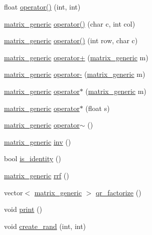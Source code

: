 \begin{DoxyCompactItemize}
\item 
float \hyperlink{classmatrix__generic_a08e93a0993b46d5373d5eb35211d0e8e}{operator()} (int, int)
\item 
\hyperlink{classmatrix__generic}{matrix\-\_\-generic} \hyperlink{classmatrix__generic_a55abbb7eb09ab51a86d3ca9289b974ab}{operator()} (char c, int col)
\item 
\hyperlink{classmatrix__generic}{matrix\-\_\-generic} \hyperlink{classmatrix__generic_a276b6bba1b5e097d83d0ec65adf30b2e}{operator()} (int row, char c)
\item 
\hyperlink{classmatrix__generic}{matrix\-\_\-generic} \hyperlink{classmatrix__generic_a860de6cafb81579ae947efa84e99c355}{operator+} (\hyperlink{classmatrix__generic}{matrix\-\_\-generic} m)
\item 
\hyperlink{classmatrix__generic}{matrix\-\_\-generic} \hyperlink{classmatrix__generic_ae2ae697439be499177bc533c6d14f5e5}{operator-\/} (\hyperlink{classmatrix__generic}{matrix\-\_\-generic} m)
\item 
\hyperlink{classmatrix__generic}{matrix\-\_\-generic} \hyperlink{classmatrix__generic_af516ed0f1f95ad685752f73f938fb195}{operator$\ast$} (\hyperlink{classmatrix__generic}{matrix\-\_\-generic} m)
\item 
\hyperlink{classmatrix__generic}{matrix\-\_\-generic} \hyperlink{classmatrix__generic_af010503cd68dced4e36c5906433d5820}{operator$\ast$} (float s)
\item 
\hyperlink{classmatrix__generic}{matrix\-\_\-generic} \hyperlink{classmatrix__generic_a281b4886a11f4cf7db17a5be90e6ae48}{operator$\sim$} ()
\item 
\hyperlink{classmatrix__generic}{matrix\-\_\-generic} \hyperlink{classmatrix__generic_a11716a2323f6e704ec8612e3c635fa86}{inv} ()
\item 
bool \hyperlink{classmatrix__generic_aa0123d920f55e4c67b340577f4c44e82}{is\-\_\-identity} ()
\item 
\hyperlink{classmatrix__generic}{matrix\-\_\-generic} \hyperlink{classmatrix__generic_aff5d88e98977b464f52dfc07f005105d}{rrf} ()
\item 
vector$<$ \hyperlink{classmatrix__generic}{matrix\-\_\-generic} $>$ \hyperlink{classmatrix__generic_a195891981c45c1f9170885240bf56692}{qr\-\_\-factorize} ()
\item 
void \hyperlink{classmatrix__generic_aa7ee3a4252c6a42cef6eda6cd17373dd}{print} ()
\item 
void \hyperlink{classmatrix__generic_afce678d57fb5a54acfc9bd8e6cec93a7}{create\-\_\-rand} (int, int)

\end{DoxyCompactItemize}
